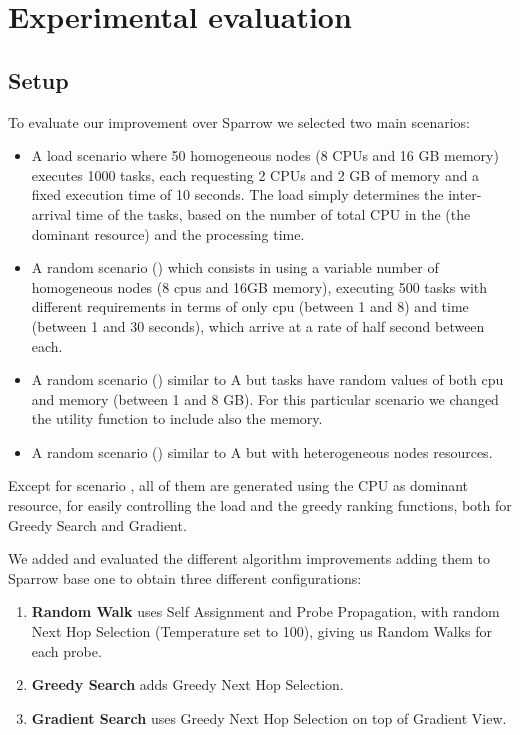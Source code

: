 \documentclass[conference]{IEEEtran}
\begin{document}
\section{Experimental evaluation}\label{sec:Evaluation}

  \subsection{Setup}
  To evaluate our improvement over Sparrow we selected two main scenarios:
  \begin{itemize}

    \item A load scenario where 50 homogeneous nodes (8 CPUs and 16 GB
      memory) executes 1000 tasks, each requesting 2 CPUs and 2 GB of
      memory and a fixed execution time of 10 seconds. The load simply
      determines the inter-arrival time of the tasks, based on the number
      of total CPU in the \dc (the dominant resource) and the processing
      time.

    \item A random scenario () which consists in using  a
      variable number of homogeneous nodes (8 cpus and 16GB memory),
      executing 500 tasks with different requirements in terms of only cpu
      (between 1 and 8) and time (between 1 and 30 seconds), which arrive
      at a rate of half second between each.

    \item A random scenario () similar to A but tasks have
      random values of both cpu and memory (between 1 and 8 GB). For this
      particular scenario we changed the utility function to include also
      the memory.

    \item A random scenario () similar to A but with
      heterogeneous nodes resources.

  \end{itemize}

  Except for scenario , all of them are generated using the CPU
  as dominant resource, for easily controlling the load and the greedy
  ranking functions, both for Greedy Search and Gradient.

  We added and evaluated the different algorithm improvements adding them
  to Sparrow base one to obtain three different configurations: 
  \begin{enumerate}
    \item \textbf{Random Walk} uses Self Assignment and Probe Propagation,
      with random Next Hop Selection (Temperature set to 100), giving us
      Random Walks for each probe. 
    \item \textbf{Greedy Search} adds Greedy Next Hop Selection.
    \item \textbf{Gradient Search} uses Greedy Next Hop Selection on top
      of Gradient View.
  \end{enumerate}
\end{document}
